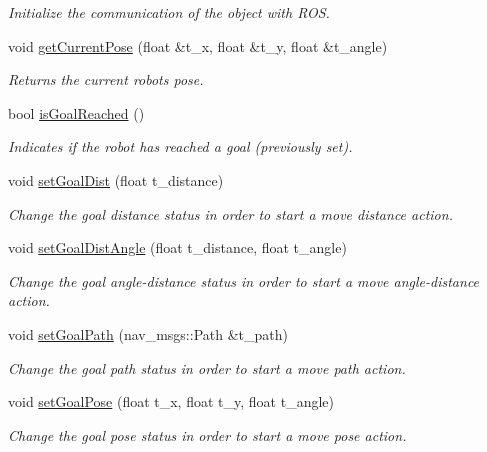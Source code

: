 \begin{DoxyCompactItemize}
\begin{DoxyCompactList}\small\item\em Initialize the communication of the object with R\+OS. \end{DoxyCompactList}\item 
void \hyperlink{class_navigation_status_a0215f41ee324eba29ff3813a7a5f0598}{get\+Current\+Pose} (float \&t\+\_\+x, float \&t\+\_\+y, float \&t\+\_\+angle)
\begin{DoxyCompactList}\small\item\em Returns the current robot\textquotesingle{}s pose. \end{DoxyCompactList}\item 
bool \hyperlink{class_navigation_status_a7ff7a9be75051aa00d51d1304579e9fe}{is\+Goal\+Reached} ()
\begin{DoxyCompactList}\small\item\em Indicates if the robot has reached a goal (previously set). \end{DoxyCompactList}\item 
void \hyperlink{class_navigation_status_af34622f0a0a443d33bde23a16eed9c43}{set\+Goal\+Dist} (float t\+\_\+distance)
\begin{DoxyCompactList}\small\item\em Change the goal distance status in order to start a move distance action. \end{DoxyCompactList}\item 
void \hyperlink{class_navigation_status_a163456f54bdfbd65b6d0b3ac55c2b744}{set\+Goal\+Dist\+Angle} (float t\+\_\+distance, float t\+\_\+angle)
\begin{DoxyCompactList}\small\item\em Change the goal angle-\/distance status in order to start a move angle-\/distance action. \end{DoxyCompactList}\item 
void \hyperlink{class_navigation_status_ad90b63b2a912ffc92860972bf0984cbd}{set\+Goal\+Path} (nav\+\_\+msgs\+::\+Path \&t\+\_\+path)
\begin{DoxyCompactList}\small\item\em Change the goal path status in order to start a move path action. \end{DoxyCompactList}\item 
void \hyperlink{class_navigation_status_a64808d980a79e4426e3fe0ea1d78edb2}{set\+Goal\+Pose} (float t\+\_\+x, float t\+\_\+y, float t\+\_\+angle)
\begin{DoxyCompactList}\small\item\em Change the goal pose status in order to start a move pose action. \end{DoxyCompactList}\item 

\end{DoxyCompactItemize}
